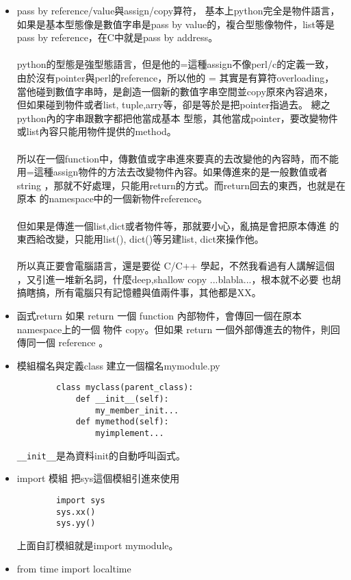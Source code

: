 \begin{itemize}
\item pass by reference/value與assign/copy算符，
	基本上python完全是物件語言，如果是基本型態像是數值字串是pass by 
	value的，複合型態像物件，list等是pass by reference，在C中就是pass by
	address。
	\\\\
	python的型態是強型態語言，但是他的=這種assign不像perl/c的定義一致，
	由於沒有pointer與perl的reference，所以他的 = 其實是有算符overloading，
	當他碰到數值字串時，是創造一個新的數值字串空間並copy原來內容過來，
	但如果碰到物件或者list, tuple,arry等，卻是等於是把pointer指過去。
	總之python內的字串跟數字都把他當成基本
	型態，其他當成pointer，要改變物件或list內容只能用物件提供的method。
	\\\\
	所以在一個function中，傳數值或字串進來要真的去改變他的內容時，而不能
	用=這種assign物件的方法去改變物件內容。如果傳進來的是一般數值或者string
	，那就不好處理，只能用return的方式。而return回去的東西，也就是在原本
	的namespace中的一個新物件reference。
	\\\\
	但如果是傳進一個list,dict或者物件等，那就要小心，亂搞是會把原本傳進
        的東西給改變，只能用list(), dict()等另建list, dict來操作他。
        \\\\
        所以真正要會電腦語言，還是要從 C/C++ 學起，不然我看過有人講解這個
        ，又引進一堆新名詞，什麼deep,shallow copy ...blabla...，根本就不必要
        也胡搞瞎搞，所有電腦只有記憶體與值兩件事，其他都是XX。
\item 函式return
	如果 return 一個 function 內部物件，會傳回一個在原本namespace上的一個
        物件 copy。但如果 return 一個外部傳進去的物件，則回傳同一個 reference
        。
\item 模組檔名與定義class 建立一個檔名mymodule.py
        \begin{verbatim}
        class myclass(parent_class):
            def __init__(self):
                my_member_init...
            def mymethod(self):
                myimplement...
        \end{verbatim}
        \verb=__init__=是為資料init的自動呼叫函式。
\item import 模組
	把sys這個模組引進來使用
        \begin{verbatim}
        import sys
        sys.xx()
        sys.yy()
        \end{verbatim}
	上面自訂模組就是import mymodule。
\item from time import localtime

\end{itemize}
